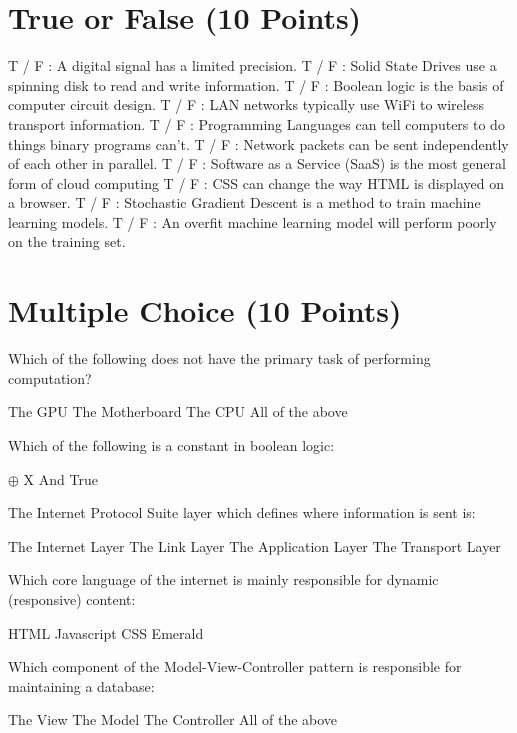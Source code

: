 \documentclass{exam}
\begin{document}
\begin{questions}
\section{True or False (10 Points)}
\question[1] T / F : A digital signal has a limited precision. 
\question[1] T / F : Solid State Drives use a spinning disk to read and write information.
\question[1] T / F : Boolean logic is the basis of computer circuit design.
\question[1] T / F : LAN networks typically use WiFi to wireless transport information.
\question[1] T / F : Programming Languages can tell computers to do things binary programs can't. 
\question[1] T / F : Network packets can be sent independently of each other in parallel.
\question[1] T / F : Software as a Service (SaaS) is the most general form of cloud computing
\question[1] T / F : CSS can change the way HTML is displayed on a browser.
\question[1] T / F : Stochastic Gradient Descent is a method to train machine learning models.
\question[1] T / F : An overfit machine learning model will perform poorly on the training set.

\section{Multiple Choice (10 Points)}
\question[1] Which of the following does not have the primary task of performing computation?
\begin{choices}
    \choice The GPU
    \choice The Motherboard
    \choice The CPU
    \choice All of the above
\end{choices}
\question[1] Which of the following is a constant in boolean logic:
\begin{choices}
    \choice $\oplus$
    \choice X
    \choice And
    \choice True
\end{choices}
\question[1] The Internet Protocol Suite layer which defines where information is sent is:
\begin{choices}
    \choice The Internet Layer
    \choice The Link Layer
    \choice The Application Layer
    \choice The Transport Layer
\end{choices}
\question[1] Which core language of the internet is mainly responsible for dynamic (responsive) content:
\begin{choices}
    \choice HTML
    \choice Javascript
    \choice CSS
    \choice Emerald
\end{choices}

\newpage
\question[1] Which component of the Model-View-Controller pattern is responsible for maintaining a database: 
\begin{choices}
    \choice The View
    \choice The Model
    \choice The Controller
    \choice All of the above
\end{choices}


\end{questions}
\end{document}
